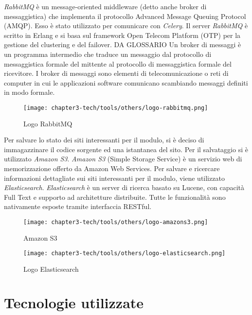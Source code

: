 \noindent
\textit{RabbitMQ} è un message-oriented middleware (detto anche broker di messaggistica) che implementa il protocollo Advanced Message Queuing Protocol (AMQP). Esso è stato utilizzato per comunicare con \textit{Celery}. Il server \textit{RabbitMQ} è scritto in Erlang e si basa sul framework Open Telecom Platform (OTP) per la gestione del clustering e del failover. DA GLOSSARIO Un broker di messaggi è un programma intermedio che traduce un messaggio dal protocollo di messaggistica formale del mittente al protocollo di messaggistica formale del ricevitore. I broker di messaggi sono elementi di telecomunicazione o reti di computer in cui le applicazioni software comunicano scambiando messaggi definiti in modo formale. 
\begin{figure}[!h] 
    \centering 
    \texttt{[image: chapter3-tech/tools/others/logo-rabbitmq.png]} 
    \caption{Logo RabbitMQ}
    \label{fig:rabbitmq} 
\end{figure}

\noindent
Per salvare lo stato dei siti interessanti per il modulo, si è deciso di immagazzinare il codice sorgente ed una istantanea del sito. Per il salvataggio si è utilizzato \textit{Amazon S3}. \textit{Amazon S3} (Simple Storage Service) è un servizio web di memorizzazione offerto da Amazon Web Services.\newline{} Per salvare e ricercare informazioni dettagliate sui siti interessanti per il modulo, viene utilizzato \textit{Elasticsearch}. \textit{Elasticsearch} è un server di ricerca basato su Lucene, con capacità Full Text e supporto ad architetture distribuite. Tutte le funzionalità sono nativamente esposte tramite interfaccia RESTful.
\begin{figure}[!h]
    \begin{minipage}{.5\textwidth} 
        \centering 
        \texttt{[image: chapter3-tech/tools/others/logo-amazons3.png]} 
        \caption{Amazon S3} 
        \label{fig:amazons3} 
    \end{minipage}%
    \begin{minipage}{.5\textwidth} 
        \centering 
        \texttt{[image: chapter3-tech/tools/others/logo-elasticsearch.png]} 
        \caption{Logo Elasticsearch} 
        \label{fig:elasticsearch} 
    \end{minipage}%
\end{figure} 

\section{Tecnologie utilizzate}

